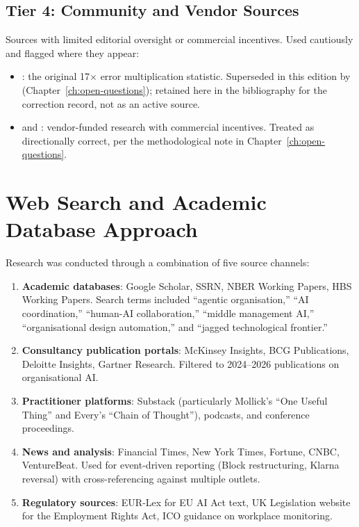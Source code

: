 \subsection{Tier 4: Community and Vendor Sources}

Sources with limited editorial oversight or commercial incentives. Used cautiously and flagged where they appear:

\begin{itemize}
  \item \textcite{TDS2026}: the original 17$\times$ error multiplication statistic. Superseded in this edition by \textcite{Cemri2025} (Chapter~\ref{ch:open-questions}); retained here in the bibliography for the correction record, not as an active source.
  \item \textcite{IBM2025} and \textcite{Gartner2025}: vendor-funded research with commercial incentives. Treated as directionally correct, per the methodological note in Chapter~\ref{ch:open-questions}.
\end{itemize}

\section{Web Search and Academic Database Approach}

Research was conducted through a combination of five source channels:

\begin{enumerate}
  \item \textbf{Academic databases}: Google Scholar, SSRN, NBER Working Papers, HBS Working Papers. Search terms included ``agentic organisation,'' ``AI coordination,'' ``human-AI collaboration,'' ``middle management AI,'' ``organisational design automation,'' and ``jagged technological frontier.''
  \item \textbf{Consultancy publication portals}: McKinsey Insights, BCG Publications, Deloitte Insights, Gartner Research. Filtered to 2024--2026 publications on organisational AI.
  \item \textbf{Practitioner platforms}: Substack (particularly Mollick's ``One Useful Thing'' and Every's ``Chain of Thought''), podcasts, and conference proceedings.
  \item \textbf{News and analysis}: Financial Times, New York Times, Fortune, CNBC, VentureBeat. Used for event-driven reporting (Block restructuring, Klarna reversal) with cross-referencing against multiple outlets.
  \item \textbf{Regulatory sources}: EUR-Lex for EU AI Act text, UK Legislation website for the Employment Rights Act, ICO guidance on workplace monitoring.
\end{enumerate}

